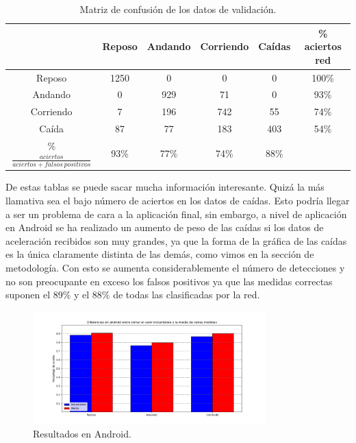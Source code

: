 \documentclass[12pt]{book}
\numberwithin{equation}{section}
\begin{document}
\begin{table}[h]
\begin{small}
\centering
  \begin{tabular} {| c || c | c | c | c || c |}
  \hline
   & Reposo & Andando & Corriendo & Caídas & \% aciertos red \\
  \hline
  \hline
  Reposo & \cellcolor{green!25}1250 & 0 & 0 & 0 & 100\% \\
  \hline
  Andando & 0 & \cellcolor{green!25}929 & 71 & 0 & 93\% \\
  \hline
  Corriendo & 7 & 196 & \cellcolor{green!25}742 & 55 & 74\% \\
  \hline
  Caída & 87 & 77 & 183 & \cellcolor{green!25}403 & 54\% \\
  \hline
  \hline
  \% $\frac{aciertos}{aciertos + falsos \, positivos}$ & 93\% & 77\% & 74\% & 88\% & \\
  \hline
  \end{tabular}
    \caption{Matriz de confusión de los datos de validación.}
  \label{confusionValidation}
\end{small}
\end{table}

\newpage
De estas tablas se puede sacar mucha información interesante. Quizá la más llamativa sea el bajo número de aciertos en los datos de caídas. Esto podría llegar a ser un problema de cara a la aplicación final, sin embargo, a nivel de aplicación en Android se ha realizado un aumento de peso de las caídas si los datos de aceleración recibidos son muy grandes, ya que la forma de la gráfica de las caídas es la única claramente distinta de las demás, como vimos en la sección de metodología. Con esto se aumenta considerablemente el número de detecciones y no son preocupante en exceso los falsos positivos ya que las medidas correctas suponen el 89\% y el 88\% de todas las clasificadas por la red.


\begin{figure}[h]
    \centering
    \includegraphics[width=0.8\textwidth]{finalesAndroid.png}
    \caption{Resultados en Android.}
    \label{fig:finalesAndroid}
\end{figure}
\end{document}
